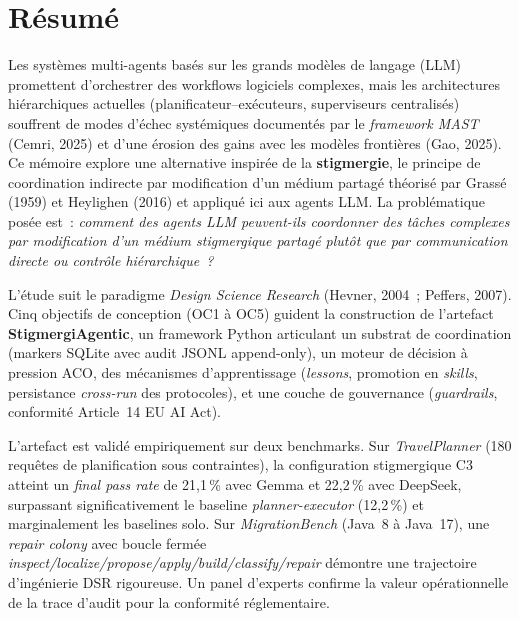\chapter*{R\'esum\'e}


Les syst\`emes multi-agents bas\'es sur les grands mod\`eles de langage (LLM)
promettent d'orchestrer des workflows logiciels complexes, mais les architectures
hi\'erarchiques actuelles (planificateur--ex\'ecuteurs, superviseurs centralis\'es)
souffrent de modes d'\'echec syst\'emiques document\'es par le \emph{framework MAST}
(Cemri, 2025) et d'une \'erosion des gains avec les mod\`eles fronti\`eres
(Gao, 2025). Ce m\'emoire explore une alternative inspir\'ee de la
\textbf{stigmergie}, le principe de coordination indirecte par modification d'un
m\'edium partag\'e th\'eoris\'e par Grass\'e (1959) et Heylighen (2016) et appliqu\'e
ici aux agents LLM. La probl\'ematique pos\'ee est~: \emph{comment des agents LLM
peuvent-ils coordonner des t\^aches complexes par modification d'un m\'edium
stigmergique partag\'e plut\^ot que par communication directe ou contr\^ole
hi\'erarchique~?}

L'\'etude suit le paradigme \emph{Design Science Research} (Hevner, 2004~;
Peffers, 2007). Cinq objectifs de conception (OC1 \`a OC5) guident la
construction de l'artefact \textbf{StigmergiAgentic}, un framework Python
articulant un substrat de coordination (markers SQLite avec audit
JSONL append-only), un moteur de d\'ecision \`a pression ACO, des
m\'ecanismes d'apprentissage (\emph{lessons}, promotion en \emph{skills},
persistance \emph{cross-run} des protocoles), et une couche de gouvernance
(\emph{guardrails}, conformit\'e Article~14 EU AI Act).

L'artefact est valid\'e empiriquement sur deux benchmarks. Sur
\emph{TravelPlanner} (180 requ\^etes de planification sous contraintes), la
configuration stigmergique C3 atteint un \emph{final pass rate} de 21,1\,\%
avec Gemma et 22,2\,\% avec DeepSeek, surpassant significativement le baseline
\emph{planner-executor} (12,2\,\%) et marginalement les baselines solo. Sur
\emph{MigrationBench} (Java~8 \`a Java~17), une \emph{repair colony} avec
boucle ferm\'ee \emph{inspect/localize/propose/apply/build/classify/repair}
d\'emontre une trajectoire d'ing\'enierie DSR rigoureuse. Un panel
d'experts confirme la valeur op\'erationnelle de la trace d'audit pour la
conformit\'e r\'eglementaire.

